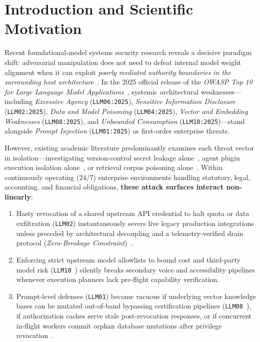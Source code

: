 \documentclass[10pt,twocolumn]{article}
\begin{document}
\begin{abstract}
\vspace{0.5em}
\noindent\textbf{Keywords:} Zero-Trust Security; Multi-Agent LLM Systems; Blast-Radius Containment; Zero-Breakage Credential Rotation; JSON Parser Differentials (\texttt{RFC 8785}); ACID Fencing Tokens; RAG Poisoning; Cryptographic Erasure (\emph{Crypto-Shredding}).
\end{abstract}

\section{Introduction and Scientific Motivation}

Recent foundational-model systems security research reveals a decisive paradigm shift: adversarial manipulation does not need to defeat internal model weight alignment when it can exploit \emph{poorly mediated authority boundaries in the surrounding host architecture}~\cite{R22,R25,R27}. In the 2025 official release of the \emph{OWASP Top 10 for Large Language Model Applications}~\cite{R29}, systemic architectural weaknesses---including \emph{Excessive Agency} (\texttt{LLM06:2025}), \emph{Sensitive Information Disclosure} (\texttt{LLM02:2025}), \emph{Data and Model Poisoning} (\texttt{LLM04:2025}), \emph{Vector and Embedding Weaknesses} (\texttt{LLM08:2025}), and \emph{Unbounded Consumption} (\texttt{LLM10:2025})---stand alongside \emph{Prompt Injection} (\texttt{LLM01:2025}) as first-order enterprise threats.

However, existing academic literature predominantly examines each threat vector in isolation---investigating version-control secret leakage alone~\cite{R15,R20}, agent plugin execution isolation alone~\cite{R25}, or retrieval corpus poisoning alone~\cite{R26}. Within continuously operating (24/7) enterprise environments handling statutory, legal, accounting, and financial obligations, \textbf{these attack surfaces interact non-linearly}:
\begin{enumerate}[leftmargin=1.4em,itemsep=2pt,topsep=3pt]
  \item Hasty revocation of a shared upstream API credential to halt quota or data exfiltration (\texttt{LLM02}) instantaneously severs live legacy production integrations unless preceded by architectural decoupling and a telemetry-verified drain protocol (\emph{Zero-Breakage Constraint})~\cite{R20}.
  \item Enforcing strict upstream model allowlists to bound cost and third-party model risk (\texttt{LLM10}~\cite{R24,R29}) silently breaks secondary voice and accessibility pipelines whenever execution planners lack pre-flight capability verification.
  \item Prompt-level defenses (\texttt{LLM01}) become vacuous if underlying vector knowledge bases can be mutated out-of-band bypassing certification pipelines (\texttt{LLM08}~\cite{R26}), if authorization caches serve stale post-revocation responses, or if concurrent in-flight workers commit orphan database mutations after privilege revocation~\cite{R03,R13}.
\end{enumerate}
\end{document}
